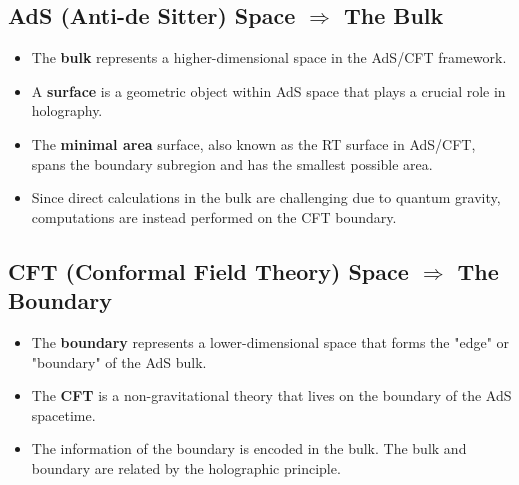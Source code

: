 \documentclass[12pt]{article}
\begin{document}
    \subsection{AdS (Anti-de Sitter) Space $\Rightarrow$ The Bulk}
        \begin{itemize}
            \item The \textbf{bulk} represents a higher-dimensional space in the AdS/CFT framework.  
            \item A \textbf{surface} is a geometric object within AdS space that plays a crucial role in holography.  
            \item The \textbf{minimal area} surface, also known as the RT surface in AdS/CFT, spans the boundary subregion and has the smallest possible area.  
            \item Since direct calculations in the bulk are challenging due to quantum gravity, computations are instead performed on the CFT boundary.  
        \end{itemize}

    \subsection{CFT (Conformal Field Theory) Space $\Rightarrow$ The Boundary}
        \begin{itemize}
            \item The \textbf{boundary} represents a lower-dimensional space that forms the "edge" or "boundary" of the AdS bulk.
            \item The \textbf{CFT} is a non-gravitational theory that lives on the boundary of the AdS spacetime.
            \item The information of the boundary is encoded in the bulk. The bulk and boundary are related by the holographic principle.
        \end{itemize}
\end{document}
